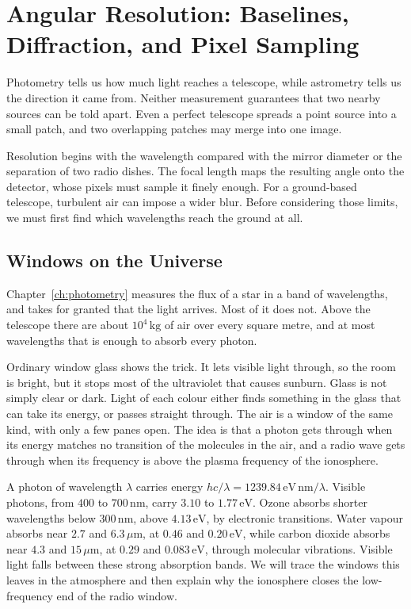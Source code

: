 \chapter{Angular Resolution: Baselines, Diffraction, and Pixel Sampling}
\label{ch:resolution}


Photometry tells us how much light reaches a telescope, while astrometry tells us the direction it came from. Neither measurement guarantees that two nearby sources can be told apart. Even a perfect telescope spreads a point source into a small patch, and two overlapping patches may merge into one image.

Resolution begins with the wavelength compared with the mirror diameter or the separation of two radio dishes. The focal length maps the resulting angle onto the detector, whose pixels must sample it finely enough. For a ground-based telescope, turbulent air can impose a wider blur. Before considering those limits, we must first find which wavelengths reach the ground at all.

\section{Windows on the Universe}
\label{sec:windows}

Chapter~\ref{ch:photometry} measures the flux of a star in a band of wavelengths, and takes for granted that the light arrives. Most of it does not. Above the telescope there are about $10^4\,\mathrm{kg}$ of air over every square metre, and at most wavelengths that is enough to absorb every photon.

Ordinary window glass shows the trick. It lets visible light through, so the room is bright, but it stops most of the ultraviolet that causes sunburn. Glass is not simply clear or dark. Light of each colour either finds something in the glass that can take its energy, or passes straight through. The air is a window of the same kind, with only a few panes open. The idea is that a photon gets through when its energy matches no transition of the molecules in the air, and a radio wave gets through when its frequency is above the plasma frequency of the ionosphere.

A photon of wavelength $\lambda$ carries energy $hc/\lambda=1239.84\,\mathrm{eV\,nm}/\lambda$. Visible photons, from $400$ to $700\,\mathrm{nm}$, carry $3.10$ to $1.77\,\mathrm{eV}$. Ozone absorbs shorter wavelengths below $300\,\mathrm{nm}$, above $4.13\,\mathrm{eV}$, by electronic transitions. Water vapour absorbs near $2.7$ and $6.3\,\mu\mathrm m$, at $0.46$ and $0.20\,\mathrm{eV}$, while carbon dioxide absorbs near $4.3$ and $15\,\mu\mathrm m$, at $0.29$ and $0.083\,\mathrm{eV}$, through molecular vibrations. Visible light falls between these strong absorption bands. We will trace the windows this leaves in the atmosphere and then explain why the ionosphere closes the low-frequency end of the radio window.


